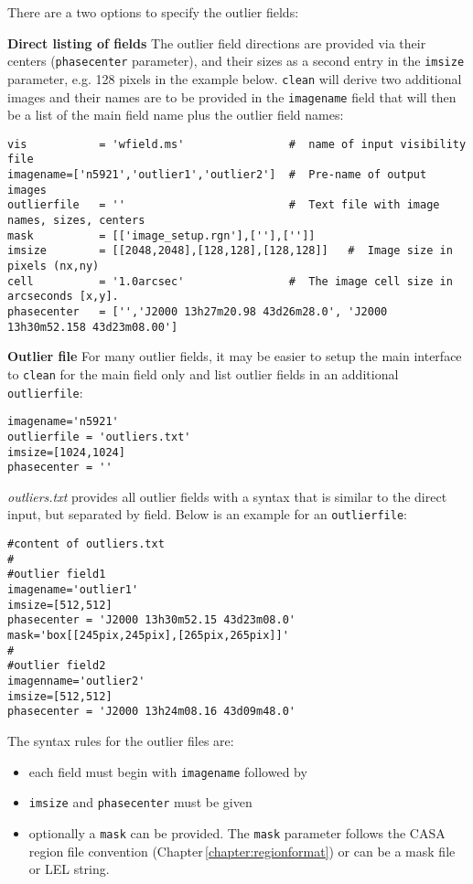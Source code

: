 There are a two options to specify the outlier fields:



{\bf Direct listing of fields} The outlier field directions are
provided via their centers ({\tt phasecenter} parameter), and their
sizes as a second entry in the {\tt imsize} parameter, e.g. 128 pixels
in the example below. {\tt clean} will derive two additional images
and their names are to be provided in the {\tt imagename} field that
will then be a list of the main field name plus the outlier field
names:

\small
\begin{verbatim}
vis           = 'wfield.ms'                #  name of input visibility file
imagename=['n5921','outlier1','outlier2']  #  Pre-name of output images
outlierfile   = ''                         #  Text file with image names, sizes, centers
mask          = [['image_setup.rgn'],[''],['']] 
imsize        = [[2048,2048],[128,128],[128,128]]   #  Image size in pixels (nx,ny)
cell          = '1.0arcsec'                #  The image cell size in arcseconds [x,y].
phasecenter   = ['','J2000 13h27m20.98 43d26m28.0', 'J2000 13h30m52.158 43d23m08.00']
\end{verbatim}
\normalsize

{\bf Outlier file} For many outlier fields, it may be easier to setup
the main interface to {\tt clean} for the main field only and list
outlier fields in an additional {\tt outlierfile}:


\small
\begin{verbatim}
imagename='n5921'
outlierfile = 'outliers.txt'
imsize=[1024,1024]
phasecenter = ''
\end{verbatim}
\normalsize

{\it outliers.txt} provides all outlier fields with a syntax that is
similar to the direct input, but separated by field. Below is an
example for an {\tt outlierfile}:

\small
\begin{verbatim}
#content of outliers.txt
#
#outlier field1
imagename='outlier1'
imsize=[512,512]
phasecenter = 'J2000 13h30m52.15 43d23m08.0'
mask='box[[245pix,245pix],[265pix,265pix]]'
#
#outlier field2
imagenname='outlier2'
imsize=[512,512]
phasecenter = 'J2000 13h24m08.16 43d09m48.0'
\end{verbatim}
\normalsize

The syntax rules for the outlier files are:
\begin{itemize}
\item each field must begin with {\tt imagename} followed by 
\item {\tt imsize} and {\tt phasecenter} must be given
\item optionally a {\tt mask} can be provided. The {\tt mask}
  parameter follows the CASA region file convention
  (Chapter\,\ref{chapter:regionformat}) or can be a mask file or LEL
  string.
\end{itemize}


